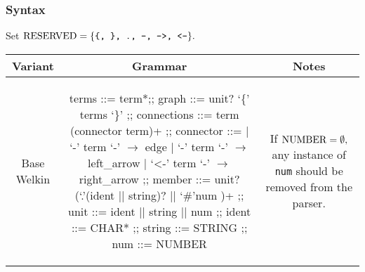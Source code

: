 \subsubsection*{Syntax}
Set $\mathrm{RESERVED} = \{\texttt{\{, \}, ., -, ->, <-}\}.$

  \begin{table}[htbp]
    \centering
  \begin{tabularx}{\textwidth}{| c | c | c |}
    Variant & Grammar & Notes \\
    \hline
	Base Welkin &
  \begin{bnf}
  terms ::= term*;;
  graph ::= unit? `\{' terms `\}' ;;
  connections ::= term (connector term)+ ;;
	connector ::=
   | `-' term `-' $\to$ edge
   | `-' term `-\>' $\to$ left\_arrow
	 | `<-' term `-' $\to$ right\_arrow ;;
  member ::= unit? (`.'(ident || string)? || `\#'num )+ ;;
	unit ::= ident || string || num ;;
  ident ::= CHAR* ;;
	string ::= STRING ;;
	num ::= NUMBER
\end{bnf}
   & If $\mathrm{NUMBER} = \emptyset,$ any instance of \texttt{num} should be removed from the parser. \\

 \end{tabularx}
 \end{table}





